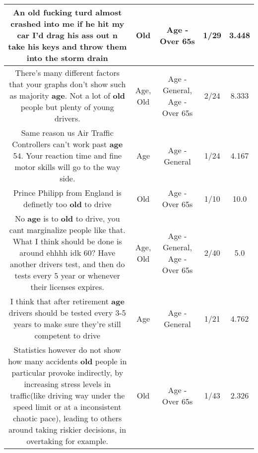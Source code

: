 \documentclass[11pt]{article}
\newlength\mylength
\begin{document}
\begin{center}
\begin{longtable}{|C{.65\mylength}|C{.30\mylength}|C{.12\mylength}|C{.12\mylength}|C{.12\mylength}|}
  \small An \textbf{old} fucking turd almost crashed into me if he hit my car I'd drag his ass out n take his keys and throw them into the storm drain\normalsize   & Old & Age - Over 65s & 1/29 & 3.448 \\  \hline
  \small There's many different factors that your graphs don't show such as majority \textbf{age}. Not a lot of \textbf{old} people but plenty of young drivers.\normalsize   & Age, Old & Age - General, Age - Over 65s & 2/24 & 8.333 \\  \hline
  \small Same reason us Air Traffic Controllers can't work past \textbf{age} 54. Your reaction time and fine motor skills will go to the way side.\normalsize   & Age & Age - General & 1/24 & 4.167 \\  \hline
  \small Prince Philipp from England is definetly too \textbf{old} to drive\normalsize   & Old & Age - Over 65s & 1/10 & 10.0 \\  \hline
  \small No \textbf{age} is to \textbf{old} to drive, you cant marginalize people like that. What I think should be done is around ehhhh idk 60? Have another drivers test, and then do tests every 5 year or whenever their licenses expires.\normalsize   & Age, Old & Age - General, Age - Over 65s & 2/40 & 5.0 \\  \hline
  \small I think that after retirement \textbf{age} drivers should be tested every 3-5 years to make sure they're still competent to drive\normalsize   & Age & Age - General & 1/21 & 4.762 \\  \hline
  \small Statistics however do not show how many accidents \textbf{old} people in particular provoke indirectly, by increasing stress levels in traffic(like driving way under the speed limit or at a inconsistent chaotic pace), leading to others around taking riskier decisions, in overtaking for example.\normalsize   & Old & Age - Over 65s & 1/43 & 2.326 \\  \hline

\end{longtable}
\end{center}
\end{document}

